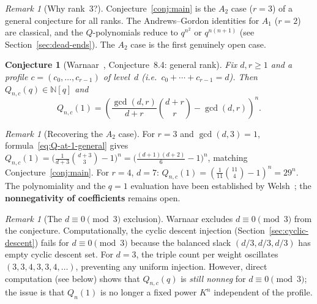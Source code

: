 \documentclass[11pt]{article}
\theoremstyle{plain}
\newtheorem{conjecture}[theorem]{Conjecture}
\theoremstyle{definition}
\theoremstyle{remark}
\newtheorem{remark}[theorem]{Remark}
\newcommand{\N}{\mathbb{N}}
\begin{document}
\begin{remark}[Why rank~3?]\label{rem:why-rank3}
Conjecture~\ref{conj:main} is the $A_2$ case ($r = 3$) of a
general conjecture for all ranks.
The Andrews--Gordon identities for $A_1$ ($r = 2$) are classical,
and the $Q$-polynomials reduce to $q^{n^2}$ or $q^{n(n+1)}$
(see Section~\ref{sec:dead-ends}).
The $A_2$ case is the first genuinely open case.
\end{remark}

\begin{conjecture}[Warnaar~\cite{warnaar-2021}, Conjecture~8.4:
general rank]
\label{conj:general-rank}
Fix $d, r \geq 1$ and a profile $c = (c_0, \ldots, c_{r-1})$
of level~$d$ (i.e.\ $c_0 + \cdots + c_{r-1} = d$).
Then $Q_{n,c}(q) \in \N[q]$ and
\begin{equation}\label{eq:Q-at-1-general}
  Q_{n,c}(1)
  = \left(
    \frac{\gcd(d,r)}{d+r}\binom{d+r}{r} - \gcd(d,r)
  \right)^{\!n}.
\end{equation}
\end{conjecture}

\begin{remark}[Recovering the $A_2$ case]
For $r = 3$ and $\gcd(d,3) = 1$, formula~\eqref{eq:Q-at-1-general}
gives
$Q_{n,c}(1) = \bigl(\tfrac{1}{d+3}\binom{d+3}{3} - 1\bigr)^n
= \bigl(\tfrac{(d+1)(d+2)}{6} - 1\bigr)^n$,
matching Conjecture~\ref{conj:main}.
For $r = 4$, $d = 7$: $Q_{n,c}(1) = (\tfrac{1}{11}\binom{11}{4} - 1)^n
= 29^n$.
The polynomiality and the $q = 1$ evaluation have been
established by Welsh~\cite{welsh-2021}; the
\textbf{nonnegativity of coefficients} remains open.
\end{remark}

\begin{remark}[The $d \equiv 0 \pmod{3}$ exclusion]\label{rem:d-mod3}
Warnaar excludes $d \equiv 0 \pmod{3}$ from the conjecture.
Computationally, the cyclic descent injection
(Section~\ref{sec:cyclic-descent}) fails for $d \equiv 0 \pmod{3}$
because the balanced slack $(d/3, d/3, d/3)$ has empty
cyclic descent set.
For $d = 3$, the triple count per weight oscillates
$(3,3,4,3,3,4,\ldots)$, preventing any uniform injection.
However, direct computation (see below) shows that $Q_{n,c}(q)$
is \emph{still nonneg} for $d \equiv 0 \pmod{3}$; the issue is
that $Q_n(1)$ is no longer a fixed power $K^n$ independent
of the profile.
\end{remark}
\end{document}
